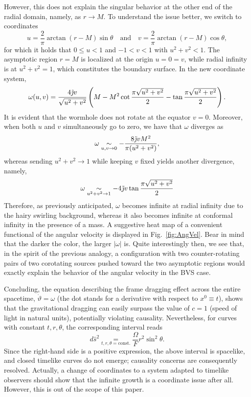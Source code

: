 \documentclass[aps,preprint,groupedaddress,nofootinbib,superscriptaddress,showkeys,showpacs,eqsecnum,amsmath,amssymb]{revtex4-1}
\begin{document}
However, this does not explain the singular behavior at the other end of the radial domain, namely, as $r\to M$. To understand the issue better, we switch to coordinates 
\begin{equation}
    u=\frac{2}{\pi}\arctan(r-M)\sin\theta\quad\text{and}\quad v=\frac{2}{\pi}\arctan(r-M)\cos\theta,\label{eq:UVcoords}
\end{equation}
for which it holds that $0\leq u < 1$ and $-1< v< 1$ with $u^2+v^2<1$. The asymptotic region $r=M$ is localized at the origin $u=0=v$, while radial infinity is at $u^2+v^2=1$, which constitutes the boundary surface. In the new coordinate system, 
\begin{equation}
    \omega(u,v) = \frac{4\Tilde{\jmath}v}{\sqrt{u^2+v^2}}\left( M - M^2 \cot \frac{\pi \sqrt{u^2+v^2}}{2} - \tan \frac{\pi \sqrt{u^2+v^2}}{2}\right).
\end{equation}
It is evident that the wormhole does not rotate at the equator $v=0$. Moreover, when both $u$ and $v$ simultaneously go to zero, we have that $\omega$ diverges as
\begin{equation}
    \omega \underset{u,v\to 0}{\sim} -\frac{8\Tilde{\jmath}vM^2}{\pi(u^2+v^2)},
\end{equation}
whereas sending $u^2+v^2\to 1$ while keeping $v$ fixed yields another divergence, namely,
\begin{equation}
    \omega \underset{u^2+v^2\to 1}{\sim} -{4\Tilde{\jmath}v}\tan \frac{\pi \sqrt{u^2+v^2}}{2}
\end{equation}
Therefore, as previously anticipated, $\omega$ becomes infinite at radial infinity due to the hairy swirling background, whereas it also becomes infinite at conformal infinity in the presence of a mass. A suggestive heat map of a convenient functional of the angular velocity is displayed in Fig.~\ref{fig:AngVel}. Bear in mind that the darker the color, the larger $|\omega|$ is. Quite interestingly then, we see that, in the spirit of the previous analogy, a configuration with two counter-rotating pairs of two corotating sources pushed toward the two asymptotic regions would exactly explain the behavior of the angular velocity in the BVS case.


Concluding, the equation describing the frame dragging effect across the entire spacetime, $\dot{\vartheta} = \omega$ (the dot stands for a derivative with respect to $x^0\equiv t$), shows that the gravitational dragging can easily surpass the value of $c=1$ (speed of light in natural units), potentially violating causality. Nevertheless, for curves with constant $t,r,\theta$, the corresponding interval reads
\begin{equation}
    d\hat{s}^2 \underset{t,r,\theta = \text{const.}}{=}\frac{\Omega}{F}r^2\sin^2\theta.
\end{equation}
Since the right-hand side is a positive expression, the above interval is spacelike, and closed timelike curves do not emerge; causality concerns are consequently resolved. Actually, a change of coordinates to a system adapted to timelike observers should show that the infinite growth is a coordinate issue after all. However, this is out of the scope of this paper. 
\end{document}
